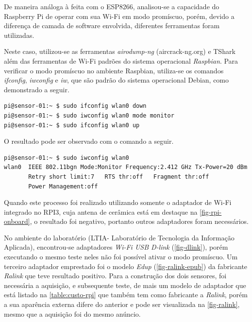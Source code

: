De maneira análoga à feita com o ESP8266, analisou-se a capacidade do Raspberry Pi
de operar com sua Wi-Fi em modo promíscuo, porém, devido a diferença de camada
de software envolvida, diferentes ferramentas foram utilizadas.

Neste caso, utilizou-se as ferramentas \emph{airodump-ng} (aircrack-ng.org) e TShark além das ferramentas de
Wi-Fi padrões do sistema operacional \emph{Raspbian}. Para verificar o modo
promíscuo no ambiente Raspbian, utiliza-se os comandos \emph{ifconfig},
\emph{iwconfig} e \emph{iw}, que são padrão do sistema operacional Debian, como
demonstrado a seguir.

\begin{lstlisting}[language=bash,caption={Ativação do modo monitor},label=code-iw-monitor]
pi@sensor-01:~ $ sudo ifconfig wlan0 down
pi@sensor-01:~ $ sudo iwconfig wlan0 mode monitor
pi@sensor-01:~ $ sudo ifconfig wlan0 up
\end{lstlisting}

O resultado pode ser observado com o comando a seguir.

\begin{lstlisting}[language=bash,caption={iwconfig com modo monitor},label=code-check-monitor]
pi@sensor-01:~ $ sudo iwconfig wlan0
wlan0  IEEE 802.11bgn Mode:Monitor Frequency:2.412 GHz Tx-Power=20 dBm
	   Retry short limit:7   RTS thr:off   Fragment thr:off
       Power Management:off
\end{lstlisting}

Quando este processo foi realizado utilizando somente o adaptador de Wi-Fi
integrado no RPI3, cuja antena de cerâmica está em destaque na
\autoref{fig-rpi-onboard}, o resultado foi negativo, portanto outros adaptadores
foram necessários.

No ambiente do laboratório (LTIA- Laboratório de Tecnologia da Informação Aplicada),
encontrou-se adaptadores \emph{Wi-Fi USB D-link}
(\autoref{fig-dlink}), porém executando o mesmo teste neles não foi possível
ativar o modo promíscuo. Um terceiro adaptador emprestado foi o modelo \emph{Edup} (\autoref{fig-ralink-epub}) da
fabricante \emph{Ralink} que teve resultado
positivo. Para a construção dos dois sensores, foi necessária a aquisição, e
subsequente teste, de mais um modelo de adaptador que está listado na
\autoref{table:custo-rpi} que também tem como fabricante a \emph{Ralink}, porém a sua
aparência externa difere do anterior e pode ser visualizada na
\autoref{fig-ralink}, mesmo que a aquisição foi do mesmo anúncio.


